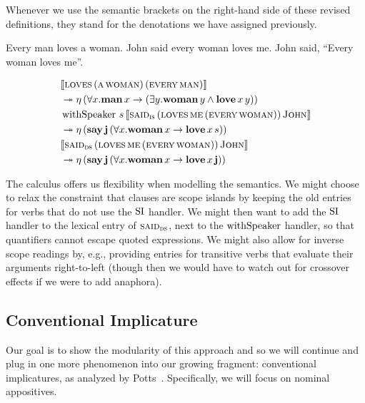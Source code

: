\documentclass{llncs}
\newcommand{\negSpaceBetweenAlign}{\vspace{-8mm}}
\begin{document}
Whenever we use the semantic brackets on the right-hand side of these
revised definitions, they stand for the denotations we have assigned
previously.

\begin{exe}
  \ex Every man loves a woman.
  \ex John said every woman loves me.
  \ex John said, ``Every woman loves me''.
\end{exe}

\negSpaceBetweenAlign

\begin{align}
  & \llbracket \textsc{loves}\,(\textsc{a}\,\textsc{woman})\,(\textsc{every}\,\textsc{man}) \rrbracket \nonumber \\
  & \twoheadrightarrow \eta\,(\forall x. \textbf{man}\,x \to (\exists y. \textbf{woman}\,y \land \textbf{love}\,x\,y)) \\
  & \operatorname{withSpeaker}\,s\,\llbracket \textsc{said}_{\textsc{is}}\,(\textsc{loves}\,\textsc{me}\,(\textsc{every}\,\textsc{woman}))\,\textsc{John} \rrbracket \nonumber \\
  & \twoheadrightarrow \eta\,(\textbf{say}\,\textbf{j}\,(\forall x. \textbf{woman}\,x \to \textbf{love}\,x\,s)) \\
  & \llbracket \textsc{said}_{\textsc{ds}}\,(\textsc{loves}\,\textsc{me}\,(\textsc{every}\,\textsc{woman}))\,\textsc{John} \rrbracket \nonumber \\
  & \twoheadrightarrow \eta\,(\textbf{say}\,\textbf{j}\,(\forall x. \textbf{woman}\,x \to \textbf{love}\,x\,\textbf{j}))
\end{align}

The calculus offers us flexibility when modelling the semantics. We might
choose to relax the constraint that clauses are scope islands by keeping
the old entries for verbs that do not use the $\operatorname{SI}$ handler. We might then
want to add the $\operatorname{SI}$ handler to the lexical entry of
$\textsc{said}_{\textsc{ds}}$, next to the $\operatorname{withSpeaker}$ handler, so that
quantifiers cannot escape quoted expressions. We might also allow for
inverse scope readings by, e.g., providing entries for transitive verbs
that evaluate their arguments right-to-left (though then we would have to
watch out for crossover effects if we were to add anaphora).

\subsection{Conventional Implicature}
\label{ssec:ci}

Our goal is to show the modularity of this approach and so we will continue
and plug in one more phenomenon into our growing fragment: conventional
implicatures, as analyzed by Potts~\cite{potts2005logic}. Specifically, we
will focus on nominal appositives.
\end{document}
